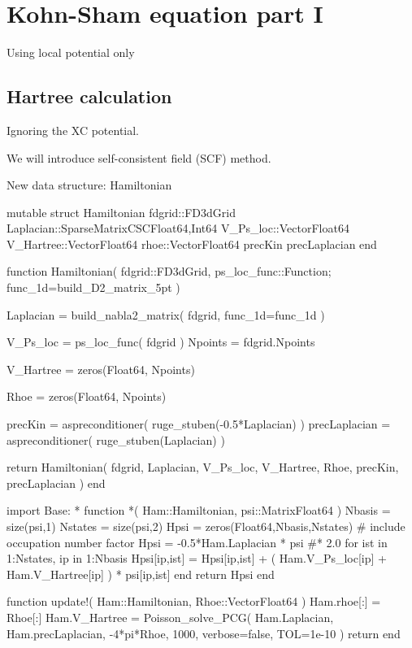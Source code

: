 \chapter{Kohn-Sham equation part I}

Using local potential only

\section{Hartree calculation}

Ignoring the XC potential.

We will introduce self-consistent field (SCF) method.

New data structure: Hamiltonian

\begin{juliacode}
mutable struct Hamiltonian
  fdgrid::FD3dGrid
  Laplacian::SparseMatrixCSC{Float64,Int64}
  V_Ps_loc::Vector{Float64}
  V_Hartree::Vector{Float64}
  rhoe::Vector{Float64}
  precKin
  precLaplacian
end
\end{juliacode}

\begin{juliacode}
function Hamiltonian( fdgrid::FD3dGrid, ps_loc_func::Function; func_1d=build_D2_matrix_5pt )
    
  Laplacian = build_nabla2_matrix( fdgrid, func_1d=func_1d )
    
  V_Ps_loc = ps_loc_func( fdgrid )
  Npoints = fdgrid.Npoints
    
  V_Hartree = zeros(Float64, Npoints)

  Rhoe = zeros(Float64, Npoints)

  precKin = aspreconditioner( ruge_stuben(-0.5*Laplacian) )
  precLaplacian = aspreconditioner( ruge_stuben(Laplacian) )
    
  return Hamiltonian( fdgrid, Laplacian, V_Ps_loc, V_Hartree, Rhoe, precKin, precLaplacian )
end
\end{juliacode}


\begin{juliacode}
import Base: *
function *( Ham::Hamiltonian, psi::Matrix{Float64} )
  Nbasis = size(psi,1)
  Nstates = size(psi,2)
  Hpsi = zeros(Float64,Nbasis,Nstates)
  # include occupation number factor
  Hpsi = -0.5*Ham.Laplacian * psi #* 2.0
  for ist in 1:Nstates, ip in 1:Nbasis
    Hpsi[ip,ist] = Hpsi[ip,ist] + ( Ham.V_Ps_loc[ip] + Ham.V_Hartree[ip] ) * psi[ip,ist]
  end
  return Hpsi
end
\end{juliacode}

\begin{juliacode}
function update!( Ham::Hamiltonian, Rhoe::Vector{Float64} )
  Ham.rhoe[:] = Rhoe[:]
  Ham.V_Hartree = Poisson_solve_PCG(
      Ham.Laplacian, Ham.precLaplacian, -4*pi*Rhoe, 1000,
      verbose=false, TOL=1e-10
  )
  return
end
\end{juliacode}

